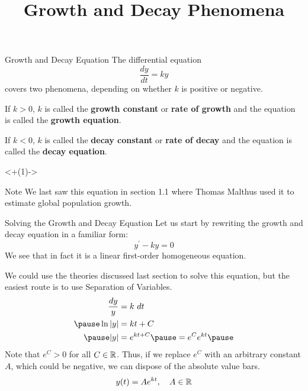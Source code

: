 \documentclass{beamer}
\title[MATH 2250 - Section 2.3]{Growth and Decay Phenomena}
\begin{document}
\begin{frame}
\titlepage
\end{frame}

\begin{frame}
\begin{block}{Growth and Decay Equation}
The differential equation
\begin{equation*}
\dfrac{dy}{dt} = ky
\end{equation*}
covers two phenomena, depending on whether $k$ is positive or negative.
\begin{description}[<+(1)- | alert@+>] %
\item[Growth:] If $k>0$, $k$ is called the \textbf{growth constant} or \textbf{rate of growth} and the equation is called the \textbf{growth equation}.
\item[Decay:] If $k<0$, $k$ is called the \textbf{decay constant} or \textbf{rate of decay} and the equation is called the \textbf{decay equation}.
\end{description}
\end{block}
\onslide<+(1)-> %
\begin{block}{Note}
We last saw this equation in section 1.1 where Thomas Malthus used it to estimate global population growth.
\end{block}
\end{frame}

\begin{frame}
\begin{block}{Solving the Growth and Decay Equation}
Let us start by rewriting the growth and decay equation in a familiar form:
\begin{equation*}
y^\prime - ky = 0
\end{equation*}\pause
We see that in fact it is a linear first-order homogeneous equation.\pause

\vspace{2mm}
We could use the theories discussed last section to solve this equation, but the easiest route is to use Separation of Variables.
\begin{equation*}
\begin{aligned}
\dfrac{dy}{y} &= k~dt \\ \pause
\ln\abs{y} &= kt + C \\ \pause
\abs{y} &= e^{kt+C} \pause = e^C e^{kt}\pause
\end{aligned}
\end{equation*}
Note that $e^C>0$ for all $C\in\mathbb{R}$. Thus, if we replace $e^C$ with an arbitrary constant $A$, which could be negative, we can dispose of the absolute value bars.
\begin{equation*}
y(t) = Ae^{kt},\quad A\in\mathbb{R}
\end{equation*}
\end{block}
\end{frame}
\end{document}
